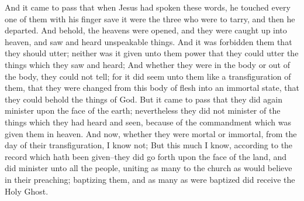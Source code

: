 And it came to pass that when Jesus had spoken these words, he touched every one of them with his finger save it were the three who were to tarry, and then he departed.
\bverse \iffalse And behold, the heavens were opened, and they were caught up into heaven, and saw and heard unspeakable things. \fi
And behold, the heavens were opened, and they were caught up into heaven, and saw and heard unspeakable things.
\bverse \iffalse And it was forbidden them that they should utter; neither was it given unto them power that they could utter the things which they saw and heard; \fi
And it was forbidden them that they should utter; neither was it given unto them power that they could utter the things which they saw and heard;
\bverse \iffalse And whether they were in the body or out of the body, they could not tell; for it did seem unto them like a transfiguration of them, that they were changed from this body of flesh into an immortal state, that they could behold the things of God. \fi
And whether they were in the body or out of the body, they could not tell; for it did seem unto them like a transfiguration of them, that they were changed from this body of flesh into an immortal state, that they could behold the things of God.
\bverse \iffalse But it came to pass that they did again minister upon the face of the earth; nevertheless they did not minister of the things which they had heard and seen, because of the commandment which was given them in heaven. \fi
But it came to pass that they did again minister upon the face of the earth; nevertheless they did not minister of the things which they had heard and seen, because of the commandment which was given them in heaven.
\bverse \iffalse And now, whether they were mortal or immortal, from the day of their transfiguration, I know not; \fi
And now, whether they were mortal or immortal, from the day of their transfiguration, I know not;
\bverse \iffalse But this much I know, according to the record which hath been given--they did go forth upon the face of the land, and did minister unto all the people, uniting as many to the church as would believe in their preaching; baptizing them, and as many as were baptized did receive the Holy Ghost. \fi
But this much I know, according to the record which hath been given--they did go forth upon the face of the land, and did minister unto all the people, uniting as many to the church as would believe in their preaching; baptizing them, and as many as were baptized did receive the Holy Ghost.
